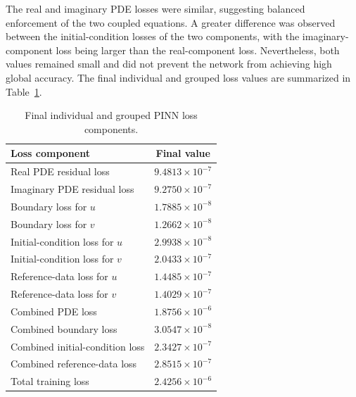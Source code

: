\documentclass[11pt]{article}
\begin{document}
The real and imaginary PDE losses were similar, suggesting balanced enforcement of the two 
coupled equations. A greater difference was observed between the initial-condition losses 
of the two components, with the imaginary-component loss being larger than the 
real-component loss. Nevertheless, both values remained small and did not prevent the 
network from achieving high global accuracy. The final individual and grouped loss values 
are summarized in Table~\ref{tab:loss_components}.

\begin{table}[htbp]
	\centering
	\caption{Final individual and grouped PINN loss components.}
	\label{tab:loss_components}
	\begin{tabular}{lc}
		\hline
		\textbf{Loss component} & \textbf{Final value} \\
		\hline
		Real PDE residual loss
		& \(9.4813\times10^{-7}\) \\
		
		Imaginary PDE residual loss
		& \(9.2750\times10^{-7}\) \\
		
		Boundary loss for \(u\)
		& \(1.7885\times10^{-8}\) \\
		
		Boundary loss for \(v\)
		& \(1.2662\times10^{-8}\) \\
		
		Initial-condition loss for \(u\)
		& \(2.9938\times10^{-8}\) \\
		
		Initial-condition loss for \(v\)
		& \(2.0433\times10^{-7}\) \\
		
		Reference-data loss for \(u\)
		& \(1.4485\times10^{-7}\) \\
		
		Reference-data loss for \(v\)
		& \(1.4029\times10^{-7}\) \\
		\hline
		Combined PDE loss
		& \(1.8756\times10^{-6}\) \\
		
		Combined boundary loss
		& \(3.0547\times10^{-8}\) \\
		
		Combined initial-condition loss
		& \(2.3427\times10^{-7}\) \\
		
		Combined reference-data loss
		& \(2.8515\times10^{-7}\) \\
		
		Total training loss
		& \(2.4256\times10^{-6}\) \\
		\hline
	\end{tabular}
	
\end{table}
\end{document}
